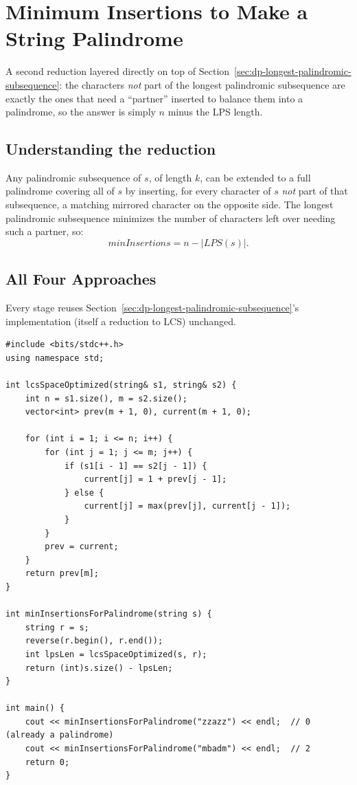 \section{Minimum Insertions to Make a String Palindrome}
\label{sec:dp-min-insertions-palindrome}


\begin{patternbox}
A second reduction layered directly on top of
Section~\ref{sec:dp-longest-palindromic-subsequence}: the characters
\emph{not} part of the longest palindromic subsequence are exactly the
ones that need a ``partner'' inserted to balance them into a palindrome,
so the answer is simply $n$ minus the LPS length.
\end{patternbox}

\subsection*{Understanding the reduction}

Any palindromic subsequence of $s$, of length $k$, can be extended to a
full palindrome covering all of $s$ by inserting, for every character of
$s$ \emph{not} part of that subsequence, a matching mirrored character
on the opposite side. The longest palindromic subsequence minimizes the
number of characters left over needing such a partner, so:
\[
  \textit{minInsertions} = n - |\textit{LPS}(s)|.
\]

\subsection*{All Four Approaches}

Every stage reuses Section~\ref{sec:dp-longest-palindromic-subsequence}'s
implementation (itself a reduction to LCS) unchanged.

\begin{lstlisting}
#include <bits/stdc++.h>
using namespace std;

int lcsSpaceOptimized(string& s1, string& s2) {
    int n = s1.size(), m = s2.size();
    vector<int> prev(m + 1, 0), current(m + 1, 0);

    for (int i = 1; i <= n; i++) {
        for (int j = 1; j <= m; j++) {
            if (s1[i - 1] == s2[j - 1]) {
                current[j] = 1 + prev[j - 1];
            } else {
                current[j] = max(prev[j], current[j - 1]);
            }
        }
        prev = current;
    }
    return prev[m];
}

int minInsertionsForPalindrome(string s) {
    string r = s;
    reverse(r.begin(), r.end());
    int lpsLen = lcsSpaceOptimized(s, r);
    return (int)s.size() - lpsLen;
}

int main() {
    cout << minInsertionsForPalindrome("zzazz") << endl;  // 0 (already a palindrome)
    cout << minInsertionsForPalindrome("mbadm") << endl;  // 2
    return 0;
}
\end{lstlisting}

